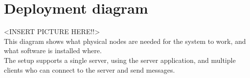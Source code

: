 \documentclass[Main]{subfiles}
\begin{document}
\section{Deployment diagram}
<INSERT PICTURE HERE!!>\\
This diagram shows what physical nodes are needed for the system to work, and what software is installed where.\\
The setup supports a single server, using the server application, and multiple clients who can connect to the server and send messages.
\end{document}
